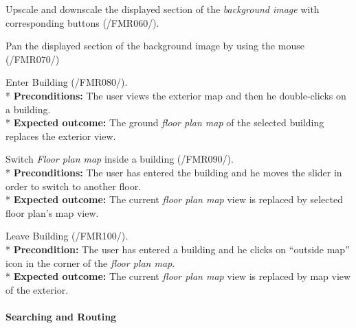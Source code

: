 \begin{numerate}[RTC]
\item Upscale and downscale the displayed section of the \textit{background image} with corresponding buttons (/FMR060/).
\item Pan the displayed section of the background image by using the mouse (/FMR070/)
\item Enter Building (/FMR080/). \\*
	\textbf{Preconditions:} The user views the exterior map and then he double-clicks on a building. \\*
	\textbf{Expected outcome:} The ground \textit{floor plan map} of the selected building replaces the exterior view.
\item Switch \textit{Floor plan map} inside a building (/FMR090/). \\*
	\textbf{Preconditions:} The user has entered the building and he moves the slider in order to switch to another floor. \\*
	\textbf{Expected outcome:} The current \textit{floor plan map} view is replaced by selected floor plan's map view.
\item Leave Building (/FMR100/). \\*
	\textbf{Precondition:} The user has entered a building and he clicks on ``outside map'' icon in the corner of the \textit{floor plan map}. \\*
	\textbf{Expected outcome:} The current \textit{floor plan map} view is replaced by map view of the exterior.
\end{numerate}


\paragraph{Searching and Routing}

